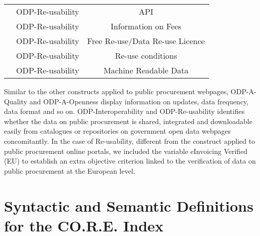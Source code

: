 \documentclass[a4paper, twoside]{report}
\begin{document}
\begin{table}[htbp]
\begin{adjustbox}{max width=\linewidth}
\begin{tabular}{ccc}
          & ODP-Re-usability & API \\
          & \cellcolor[rgb]{ .851,  .851,  .851}ODP-Re-usability & \cellcolor[rgb]{ .851,  .851,  .851}Information on Fees \\
          & \cellcolor[rgb]{ .851,  .851,  .851}ODP-Re-usability & \cellcolor[rgb]{ .851,  .851,  .851}Free Re-use/Data Re-use Licence \\
          & \cellcolor[rgb]{ .851,  .851,  .851}ODP-Re-usability & \cellcolor[rgb]{ .851,  .851,  .851}Re-use conditions \\
          & \cellcolor[rgb]{ .851,  .851,  .851}ODP-Re-usability & \cellcolor[rgb]{ .851,  .851,  .851}Machine Readable Data \\
    \bottomrule
    \end{tabular}%
    \end{adjustbox}
  \label{tab:core_index_disaggregation2}%
\end{table}%

Similar to the other constructs applied to public procurement webpages, ODP-A-Quality and ODP-A-Openness display information on updates, data frequency, data format and so on. ODP-Interoperability and ODP-Re-usability identifies whether the data on public procurement is shared, integrated and downloadable easily from catalogues or repositories on government open data webpages concomitantly. In the case of Re-usability, different from the construct applied to public procurement online portals, we included the variable eInvoicing Verified (EU) to establish an extra objective criterion linked to the verification of data on public procurement at the European level.   

\section{Syntactic and Semantic Definitions for the CO.R.E. Index}
\end{document}
